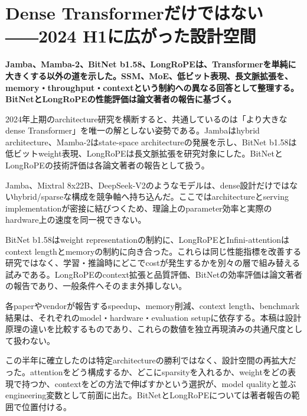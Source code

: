 \section{Dense Transformerだけではない――2024 H1に広がった設計空間}
\label{pkg:architecture-efficiency}
\noindent\textbf{Jamba、Mamba-2、BitNet b1.58、LongRoPEは、Transformerを単純に大きくする以外の道を示した。SSM、MoE、低ビット表現、長文脈拡張を、memory・throughput・contextという制約への異なる回答として整理する。BitNetとLongRoPEの性能評価は論文著者の報告に基づく。}\autocite{src-0cba3ed32188,src-b5fbfc0d43e4,src-e0e69bb00ff7,src-fb3cf48135e8}

2024年上期のarchitecture研究を横断すると、共通しているのは「より大きなdense Transformer」を唯一の解としない姿勢である。Jambaはhybrid architecture、Mamba-2はstate-space architectureの発展を示し、BitNet b1.58は低ビットweight表現、LongRoPEは長文脈拡張を研究対象にした。BitNetとLongRoPEの技術評価は各論文著者の報告として扱う。\autocite{src-0cba3ed32188,src-b5fbfc0d43e4,src-e0e69bb00ff7,src-fb3cf48135e8}


Jamba、Mixtral 8x22B、DeepSeek-V2のようなモデルは、dense設計だけではないhybrid/sparseな構成を競争軸へ持ち込んだ。ここではarchitectureとserving implementationが密接に結びつくため、理論上のparameter効率と実際のhardware上の速度を同一視できない。\autocite{src-05f98c47f3e8,src-b5fbfc0d43e4,src-d9d69089eb6a}


BitNet b1.58はweight representationの制約に、LongRoPEとInfini-attentionはcontext lengthとmemoryの制約に向き合った。これらは同じ性能指標を改善する研究ではなく、学習・推論時にどこでcostが発生するかを別々の層で組み替える試みである。LongRoPEのcontext拡張と品質評価、BitNetの効率評価は論文著者の報告であり、一般条件へそのまま外挿しない。\autocite{src-2eb2353f0533,src-e0e69bb00ff7,src-fb3cf48135e8}


\begin{claimboundary}
各paperやvendorが報告するspeedup、memory削減、context length、benchmark結果は、それぞれのmodel・hardware・evaluation setupに依存する。本稿は設計原理の違いを比較するものであり、これらの数値を独立再現済みの共通尺度として扱わない。\autocite{src-0cba3ed32188,src-b5fbfc0d43e4,src-e0e69bb00ff7,src-fb3cf48135e8}
\end{claimboundary}

この半年に確立したのは特定architectureの勝利ではなく、設計空間の再拡大だった。attentionをどう構成するか、どこにsparsityを入れるか、weightをどの表現で持つか、contextをどの方法で伸ばすかという選択が、model qualityと並ぶengineering変数として前面に出た。BitNetとLongRoPEについては著者報告の範囲で位置付ける。\autocite{src-05f98c47f3e8,src-0cba3ed32188,src-b5fbfc0d43e4,src-d9d69089eb6a,src-e0e69bb00ff7,src-fb3cf48135e8}
